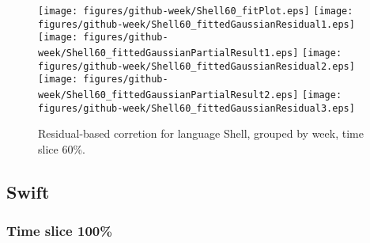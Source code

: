 \begin{figure}[hb]
\centering
{}
{\texttt{[image: figures/github-week/Shell60\_fitPlot.eps]}}
{\texttt{[image: figures/github-week/Shell60\_fittedGaussianResidual1.eps]}}
{\texttt{[image: figures/github-week/Shell60\_fittedGaussianPartialResult1.eps]}}
{\texttt{[image: figures/github-week/Shell60\_fittedGaussianResidual2.eps]}}
{\texttt{[image: figures/github-week/Shell60\_fittedGaussianPartialResult2.eps]}}
{\texttt{[image: figures/github-week/Shell60\_fittedGaussianResidual3.eps]}}
\caption{Residual-based corretion for language Shell, grouped by week, time slice 60\%.}
\end{figure}


\clearpage 
\newpage 


\subsection{Swift}

\FloatBarrier

\subsubsection{Time slice 100\%}


